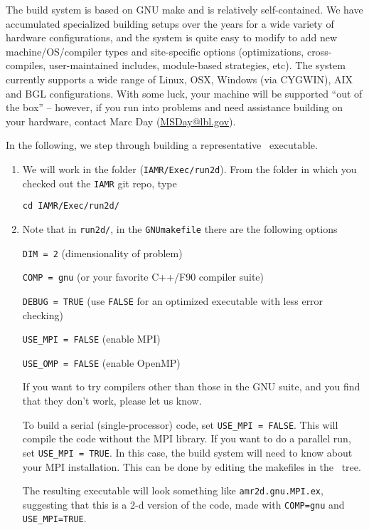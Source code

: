 The build system is based on GNU make and is relatively self-contained.  We have accumulated 
specialized building setups over the years for a wide variety of hardware configurations, and 
the system is quite easy to modify to add new machine/OS/compiler types and site-specific 
options (optimizations, cross-compiles, user-maintained includes, module-based strategies, etc).
The system currently supports a wide range of Linux, OSX, Windows (via CYGWIN), AIX and BGL 
configurations. With some luck, your machine will be supported ``out of the box'' -- however, if 
you run into problems and need assistance building on your hardware, contact Marc Day (\url{MSDay@lbl.gov}).

In the following, we step through building a representative \iamr\ executable.
\begin{enumerate}
\item We will work in the folder ({\tt IAMR/Exec/run2d}).
From the folder in which you checked out the {\tt IAMR} git repo, type
\begin{verbatim}
cd IAMR/Exec/run2d/
\end{verbatim}

\item Note that in {\tt run2d/}, in the {\tt GNUmakefile} there are the following options

{\tt DIM = 2} (dimensionality of problem)

{\tt COMP = gnu} (or your favorite C++/F90 compiler suite)

{\tt DEBUG = TRUE} (use {\tt FALSE} for an optimized executable with less error checking)

{\tt USE\_MPI = FALSE} (enable MPI)

{\tt USE\_OMP = FALSE} (enable OpenMP)

If you want to try compilers other than those in the GNU suite, and you find that they don't
work, please let us know.

To build a serial (single-processor) code, set {\tt USE\_MPI = FALSE}.
This will compile the code without the MPI library.  If you want to do
a parallel run, set {\tt USE\_MPI = TRUE}.  In this
case, the build system will need to know about your MPI installation.
This can be done by editing the makefiles in the \amrex\ tree.

The resulting executable will look something like {\tt amr2d.gnu.MPI.ex},
suggesting that this is a 2-d version of the code, made with 
{\tt COMP=gnu} and {\tt USE\_MPI=TRUE}.

\end{enumerate}


